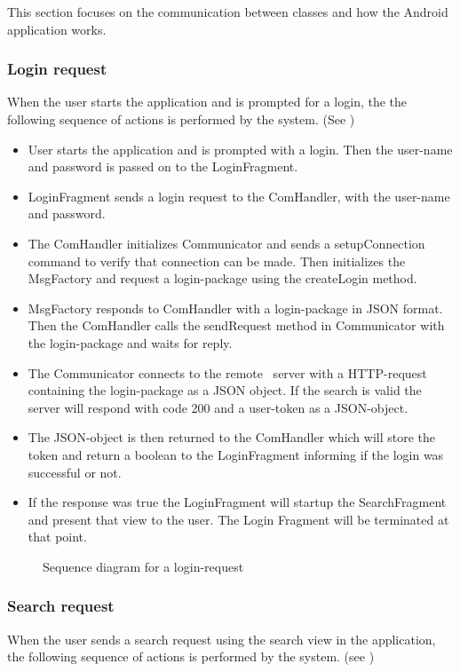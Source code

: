 This section focuses on the communication  between classes and how the Android application works.
\subsubsection{Login request}
	When the user starts the application and is prompted for a login, the the following sequence of actions is performed by the system. (See )	\\
	
	\begin{itemize}
		\item
			User starts the application and is prompted with a login.
			Then the user-name and password is passed on to the LoginFragment.
		\item
			LoginFragment sends a login request to the ComHandler, with the user-name and password.
		\item
			The ComHandler initializes Communicator and sends a setupConnection command to verify that connection can be made. Then initializes the MsgFactory and request a login-package using the createLogin method.
		\item
			MsgFactory responds to ComHandler with a login-package in JSON format. Then the ComHandler calls the sendRequest method in Communicator with the login-package and waits for reply.
		\item
			The Communicator connects to the remote \appName\ server with a HTTP-request containing the login-package as a JSON object. If the search is valid the server will respond with code 200 and a user-token as a JSON-object.
		\item
			The JSON-object is then returned to the ComHandler which will store the token and return a boolean to the LoginFragment informing if the login was successful or not.
		\item 
			If the response was true the LoginFragment will startup the SearchFragment and present that view to the user. The Login Fragment will be terminated at that point. 
			
	\end{itemize}

	\begin{figure}[h]
		\caption{Sequence diagram for a login-request}
		\label{fig:and_loginseq}
	\end{figure}
	
\subsubsection{Search request}
	When the user sends a search request using the search view in the application, the following sequence of actions is performed by the system.
	(see )
	
